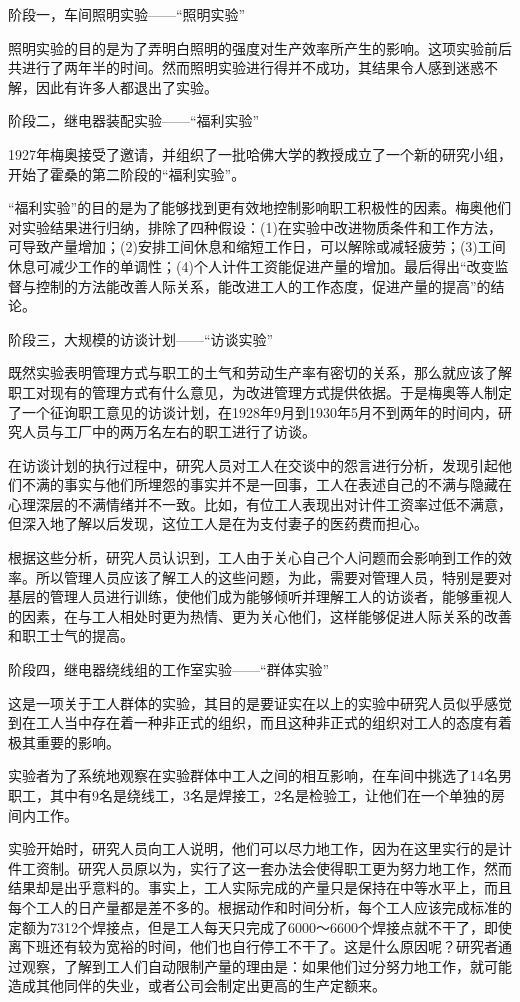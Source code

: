 \documentclass[11pt]{ctexart}
\begin{document}
阶段一，车间照明实验——“照明实验”

照明实验的目的是为了弄明白照明的强度对生产效率所产生的影响。这项实验前后共进行了两年半的时间。然而照明实验进行得并不成功，其结果令人感到迷惑不解，因此有许多人都退出了实验。

阶段二，继电器装配实验——“福利实验”

1927年梅奥接受了邀请，并组织了一批哈佛大学的教授成立了一个新的研究小组，开始了霍桑的第二阶段的“福利实验”。

“福利实验”的目的是为了能够找到更有效地控制影响职工积极性的因素。梅奥他们对实验结果进行归纳，排除了四种假设：(1)在实验中改进物质条件和工作方法，可导致产量增加；(2)安排工间休息和缩短工作日，可以解除或减轻疲劳；(3)工间休息可减少工作的单调性；(4)个人计件工资能促进产量的增加。最后得出“改变监督与控制的方法能改善人际关系，能改进工人的工作态度，促进产量的提高”的结论。

阶段三，大规模的访谈计划——“访谈实验”

既然实验表明管理方式与职工的土气和劳动生产率有密切的关系，那么就应该了解职工对现有的管理方式有什么意见，为改进管理方式提供依据。于是梅奥等人制定了一个征询职工意见的访谈计划，在1928年9月到1930年5月不到两年的时间内，研究人员与工厂中的两万名左右的职工进行了访谈。

在访谈计划的执行过程中，研究人员对工人在交谈中的怨言进行分析，发现引起他们不满的事实与他们所埋怨的事实并不是一回事，工人在表述自己的不满与隐藏在心理深层的不满情绪并不一致。比如，有位工人表现出对计件工资率过低不满意，但深入地了解以后发现，这位工人是在为支付妻子的医药费而担心。

根据这些分析，研究人员认识到，工人由于关心自己个人问题而会影响到工作的效率。所以管理人员应该了解工人的这些问题，为此，需要对管理人员，特别是要对基层的管理人员进行训练，使他们成为能够倾听并理解工人的访谈者，能够重视人的因素，在与工人相处时更为热情、更为关心他们，这样能够促进人际关系的改善和职工士气的提高。

阶段四，继电器绕线组的工作室实验——“群体实验”

这是一项关于工人群体的实验，其目的是要证实在以上的实验中研究人员似乎感觉到在工人当中存在着一种非正式的组织，而且这种非正式的组织对工人的态度有着极其重要的影响。

实验者为了系统地观察在实验群体中工人之间的相互影响，在车间中挑选了14名男职工，其中有9名是绕线工，3名是焊接工，2名是检验工，让他们在一个单独的房间内工作。

实验开始时，研究人员向工人说明，他们可以尽力地工作，因为在这里实行的是计件工资制。研究人员原以为，实行了这一套办法会使得职工更为努力地工作，然而结果却是出乎意料的。事实上，工人实际完成的产量只是保持在中等水平上，而且每个工人的日产量都是差不多的。根据动作和时间分析，每个工人应该完成标准的定额为7312个焊接点，但是工人每天只完成了6000～6600个焊接点就不干了，即使离下班还有较为宽裕的时间，他们也自行停工不干了。这是什么原因呢？研究者通过观察，了解到工人们自动限制产量的理由是：如果他们过分努力地工作，就可能造成其他同伴的失业，或者公司会制定出更高的生产定额来。
\end{document}
